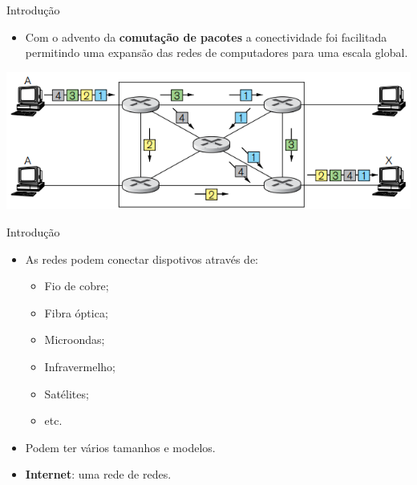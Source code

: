\documentclass{libs/ufc_format}
\begin{document}
\begin{frame}{Introdução}
    \begin{itemize}
        \justifying
        \item Com o advento da \textbf{comutação de pacotes} a conectividade foi facilitada permitindo uma expansão das redes de computadores para uma escala global.
    \end{itemize}
    \centering
    \includegraphics[width=\textwidth]{media/Comutação Pacote}
\end{frame}

\begin{frame}{Introdução}
    \begin{itemize}
        \justifying
        \item As redes podem conectar dispotivos através de:
            \begin{itemize}
                \item<2-> Fio de cobre;
                \item<3-> Fibra óptica;
                \item<4-> Microondas;
                \item<5-> Infravermelho;
                \item<6-> Satélites;
                \item<6-> etc.
            \end{itemize}
        \item<7-> Podem ter vários tamanhos e modelos.
        \item<8> \textbf{Internet}: uma rede de redes.
    \end{itemize}
\end{frame}
\end{document}
